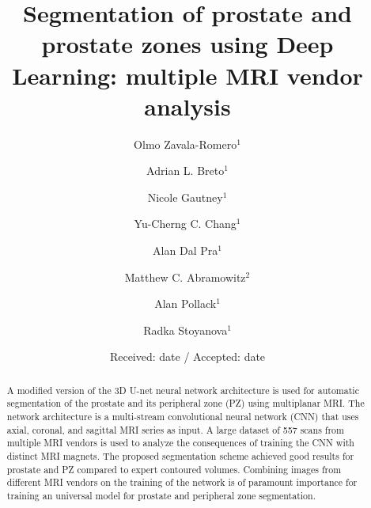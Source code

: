 \documentclass[referee]{svjour3}
\begin{document}
\title{ Segmentation of prostate and prostate zones using Deep Learning: multiple MRI vendor analysis }

\author{
  Olmo Zavala-Romero$^1$ \and
  Adrian L. Breto$^1$ \and  
  Nicole Gautney$^1$ \and  
  Yu-Cherng C. Chang$^1$ \and 
  Alan Dal Pra$^1$ \and  
  Matthew C. Abramowitz$^2$ \and  
  Alan Pollack$^1$ \and  
  Radka Stoyanova$^1$
}

\date{Received: date / Accepted: date}

\maketitle

\begin{abstract}
A modified version of the 3D U-net  neural network architecture is used for automatic segmentation of the prostate and its peripheral zone (PZ) using multiplanar MRI. The network architecture is a multi-stream convolutional neural network (CNN) that uses axial, coronal, and sagittal MRI series as input.  A large dataset of 557 scans from multiple MRI vendors is used to analyze the consequences of training the CNN with distinct MRI magnets. The proposed segmentation scheme achieved good results for prostate and PZ compared to expert contoured volumes. Combining images from different MRI vendors on the training of the network is of paramount importance for training an universal model for prostate and peripheral zone segmentation. 

\end{abstract}











\end{document}

